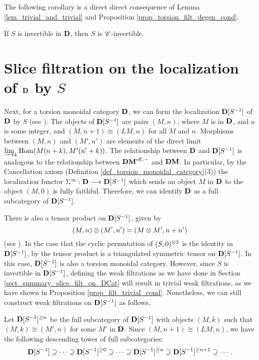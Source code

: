 The following corollary is a direct direct consequence of Lemma 
\ref{lem_trivial_and_trivial} and Proposition 
\ref{prop_torsion_filt_degen_cond}.

\begin{cor}\label{cor_invert_implies_C_invert}
If $S$ is invertible in $\DCat$, then $S$ is $\Cat{C}$-invertible.
\end{cor}

\section{Slice filtration on the localization of $\DCat$ by $S$}

Next, for a torsion monoidal category $\DCat$, we can form the
localization $\DCatLoc{S}$ of $\DCat$ by $S$ (see \cite[8A]{MVW}). 
The objects of $\DCatLoc{S}$ are pairs $(M, n)$, where $M$ is 
in $\DCat$, and $n$ is some integer, and $(M, n + 1) \cong (LM, 
n)$ for all $M$ and $n$. Morphisms between $(M, n)$ and $(M', n')$
are elements of the direct limit $\varinjlim_{k} \hom(M(n + k),
M'(n' + k))$. The relationship between $\DCat$ and $\DCatLoc{S}$
is analogous to the relationship between $\DMeff$ and $\DM$. In
particular, by the Cancellation axiom (Definition 
\ref{def_torsion_monoidal_category}(3)) the localization functor 
$\Sigma^\infty: \DCat \to \DCatLoc{S}$ which sends an object $M$ 
in $\DCat$ to the object $(M, 0)$ is fully faithful. Therefore, 
we can identify $\DCat$ as a full subcategory of $\DCatLoc{S}$. 

There is also a tensor product on $\DCatLoc{S}$, given by
\[
(M, n) \tensor (M', n') = (M \tensor M', n + n')
\]
(see \cite[8A]{MVW}). In the case that the cyclic permutation of 
$(S, 0)^{\tensor 3}$ is the identity in $\DCatLoc{S}$, by 
\cite[8A.10, 8A.11]{MVW} the tensor product is a
triangulated symmetric tensor on $\DCatLoc{S}$. In this case, 
$\DCatLoc{S}$ is also a torsion monoidal category. However, since 
$S$ is invertible in $\DCatLoc{S}$, defining the weak filtrations as we have done 
in Section \ref{sect_summary_slice_filt_on_DCat} will result in 
trivial weak filtrations, as we have shown in Proposition 
\ref{prop_filt_trivial_cond}. Nonetheless, we can still construct
weak filtrations on $\DCatLoc{S}$ as follows.

\begin{defn}\label{def_GFiltDLoc_general}
Let $\Prerad{n}{\DCatLoc{S}}$ be the full subcategory of 
$\DCatLoc{S}$ with objects $(M, k)$ such that $(M, k) \cong
(M', n)$ for some $M'$ in $\DCat$. Since $(M, n + 1) \cong 
(LM, n)$, we have the following descending tower of full 
subcategories:
\[
\DCatLoc{S} \supseteq \cdots \supseteq \Prerad{0}{\DCatLoc{S}}
   \supseteq \cdots \supseteq \Prerad{n}{\DCatLoc{S}} \supseteq 
   \Prerad{n + 1}{\DCatLoc{S}} \supseteq \cdots.
\]
\end{defn}

